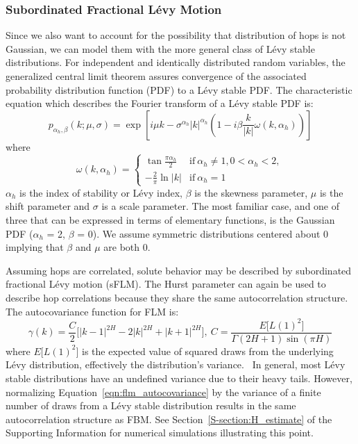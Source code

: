 \documentclass{article}
\begin{document}
  \subsubsection{Subordinated Fractional L\'evy Motion}\label{method:sflm}
  Since we also want to account for the possibility that
  distribution of hops is not Gaussian, we can model them with the
  more general class of L\'evy stable distributions. For independent and identically
  distributed random variables, the generalized central limit theorem assures 
  convergence of the associated probability distribution function (PDF) to a 
  L\'evy stable PDF. \cite{klages_anomalous_2008} The characteristic equation which 
  describes the Fourier transform of a L\'evy stable PDF is:
  \begin{equation}
    p_{\alpha_h, \beta}(k;\mu,\sigma) =\exp\left[i\mu k - \sigma^{\alpha_h}|k|^{\alpha_h}\left(1 - i\beta\frac{k}{|k|}\omega(k, \alpha_h)\right)\right]
  \end{equation}
  where \\
  \[\omega(k, \alpha_h) = \begin{cases}
  	\tan{\frac{\pi \alpha_h}{2}} & \text{if}~\alpha_h \neq 1, 0 < \alpha_h < 2, \\
  	-\frac{2}{\pi}\ln |k| & \text{if}~\alpha_h = 1
  	 \end{cases}
  \]
  $\alpha_h$ is the index of stability or L\'evy index, $\beta$ is the skewness 
  parameter, $\mu$ is the shift parameter and $\sigma$ is a scale parameter. The most
  familiar case, and one of three that can be expressed in terms of elementary functions,
  is the Gaussian PDF ($\alpha_h$ = 2, $\beta$ = 0). We assume symmetric distributions
  centered about 0 implying that $\beta$ and $\mu$ are both 0.
  
  Assuming hops are correlated, solute behavior may be described by subordinated 
  fractional L\'evy motion (sFLM). The Hurst parameter can again be used to describe
  hop correlations because they share the same autocorrelation structure.~\cite{tikanmaki_fractional_2010}
  The autocovariance function for FLM is:
  \begin{equation}
    \gamma(k) = \dfrac{C}{2}\bigg[|k-1|^{2H} - 2|k|^{2H} + |k+1|^{2H}\bigg],
    ~C = \frac{E\big[L(1)^2\big]}{\Gamma(2H + 1)\sin(\pi H)}
    \label{eqn:flm_autocovariance}
  \end{equation}
  where $E\big[L(1)^2\big]$ is the expected value of squared draws from the 
  underlying L\'evy distribution, effectively the distribution's 
  variance.~\cite{bishwal_maximum_2011} In general, most L\'evy stable distributions
  have an undefined variance due to their heavy tails. However, normalizing
  Equation~\ref{eqn:flm_autocovariance} by the variance of a finite number of draws
  from a L\'evy stable distribution results in the same autocorrelation structure as FBM.
  See Section~\ref{S-section:H_estimate} of the Supporting Information for numerical
  simulations illustrating this point.  %
  
\end{document}
